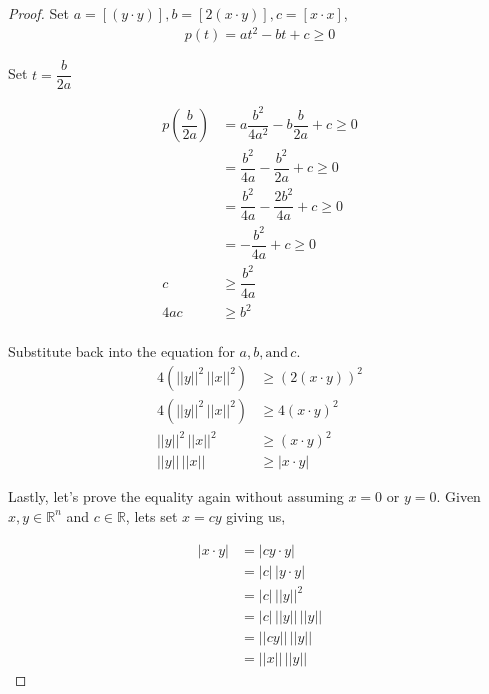 \documentclass[12pt]{article}
\newenvironment{definition}[2][Definition]{\begin{trivlist}
\item[\hskip \labelsep {\bfseries #1}\hskip \labelsep {\bfseries #2}]}{\end{trivlist}}
\begin{document}
\begin{definition}{2.12}
\begin{proof}
\noindent
Set \(a = [(y \cdot y)], b = [2(x\cdot y)], c = [x\cdot x]\),
\begin{equation}
\begin{split}
    p(t) = at^2 - bt + c \geq 0
\end{split}
\end{equation}


\noindent
Set \(t = \dfrac{b}{2a}\)

\begin{equation}
\begin{split}
    p(\dfrac{b}{2a}) &= a\dfrac{b^2}{4a^2} - b\dfrac{b}{2a} + c \geq 0 \\
    &= \dfrac{b^2}{4a} - \dfrac{b^2}{2a} + c \geq 0 \\
    &= \dfrac{b^2}{4a} - \dfrac{2b^2}{4a} + c \geq 0 \\
    &= -\dfrac{b^2}{4a} + c \geq 0 \\
    c &\geq \dfrac{b^2}{4a} \\
    4ac &\geq b^2 \\
\end{split}
\end{equation}

\noindent
Substitute back into the equation for \(a, b, \textrm{and} \, c\).
\begin{equation}
\begin{split}
    4(||y||^2 \, ||x||^2) &\geq (2(x \cdot y))^2 \\
    4(||y||^2 \, ||x||^2) &\geq 4(x \cdot y)^2 \\
    ||y||^2 \, ||x||^2 &\geq (x \cdot y)^2 \\
    ||y|| \, ||x|| &\geq |x \cdot y|
\end{split}
\end{equation}

\noindent
Lastly, let's prove the equality again without assuming \(x=0\) or \(y=0\). Given \(x,y \in \mathbb{R}^n\) and \(c \in \mathbb{R}\), lets set \(x = cy\) giving us,

\begin{equation}
\begin{split}
    |x \cdot y| &= |cy\cdot y| \\
                &= |c| \, |y\cdot y| \\
                &= |c| \, ||y||^2 \\
                &= |c| \, ||y|| \, ||y|| \\
                &= ||cy|| \, ||y|| \\
                &= ||x|| \, ||y||
\end{split}
\end{equation}
\end{proof}
\end{definition}
\end{document}
